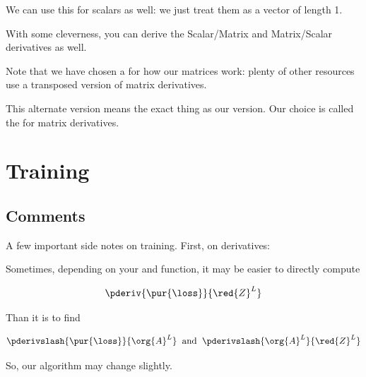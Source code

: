             We can use this for scalars as well: we just treat them as a vector of length 1.
            
            With some cleverness, you can derive the Scalar/Matrix and Matrix/Scalar derivatives as well.  
                \\


            \begin{clarification}
                Note that we have chosen a  for how our matrices work: plenty of other resources use a transposed version of matrix derivatives.

                This alternate version means the exact  thing as our version. Our choice is called the  for matrix derivatives.
            \end{clarification}
            \phantom{}

\pagebreak
        


        
        
\pagebreak
\section{Training}
    \label{training}
    
    \subsection{Comments}
    
        A few important side notes on training. First, on derivatives:\\
        
        \begin{concept}
            Sometimes, depending on your  and  function, it may be easier to directly compute
            
            \begin{equation*}
                \pderiv{ \pur{\loss} }{ \red{Z}^{L} }
            \end{equation*}
            
            Than it is to find 
            
            \begin{equation*}
                \pderivslash{ \pur{\loss} }{ \org{A}^L } 
                \;\;
                \text{and}
                \;\;
                \pderivslash{ \org{A}^L } { \red{Z}^{L} }
            \end{equation*}
            
            So, our algorithm may change slightly.
        \end{concept}
        
